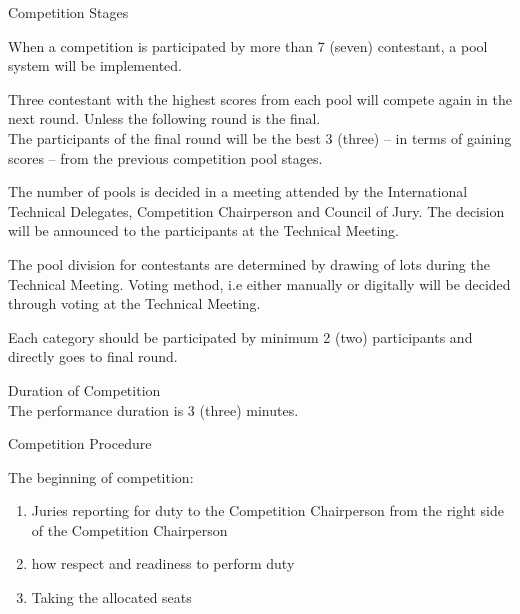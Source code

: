 \begin{legal}
\begin{legal}
\begin{legal}
        \end{legal}



    \end{legal}
\item Competition Stages
    \begin{legal}
    \item When a competition is participated by more than 7 (seven) contestant, a pool system will be implemented.
    \item Three contestant with the highest scores from each pool will compete again in the next round. Unless the 
          following round is the final. \\
          The participants of the final round will be the best 3 (three) – in terms of gaining scores – from the 
          previous competition pool stages.
    \item The number of pools is decided in a meeting attended by the International Technical Delegates, Competition 
          Chairperson and Council of Jury. The decision will be announced to the participants at the Technical Meeting.
    \item The pool division for contestants are determined by drawing of lots during the Technical Meeting. Voting method, i.e either manually or digitally will be decided through voting at the Technical Meeting.
    \item Each category should be participated by minimum 2 (two) participants and directly goes to final round.
    \end{legal}

\item Duration of Competition \\

      The performance duration is 3 (three) minutes.

\item Competition Procedure
    \begin{legal}
    \item The beginning of competition:
        \begin{enumerate}[label=\alph*.]
        \item Juries reporting for duty to the Competition Chairperson from the right side of the 
              Competition Chairperson
        \item how respect and readiness to perform duty
        \item Taking the allocated seats
        \end{enumerate}


\end{legal}
\end{legal}
